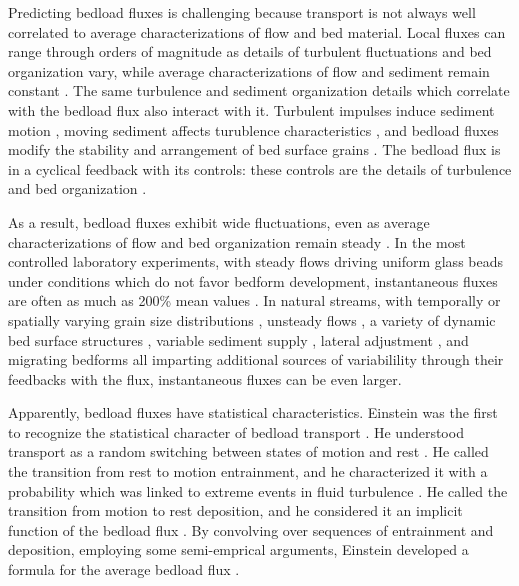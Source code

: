 Predicting bedload fluxes is challenging because transport is not always well correlated to average characterizations of flow and bed material. 
Local fluxes can range through orders of magnitude as details of turbulent fluctuations and bed organization vary, while average characterizations of flow and sediment remain constant \citep{Sumer2003, Charru2004, Hassan2008, Venditti2017}.
The same turbulence and sediment organization details which correlate with the bedload flux also interact with it. 
Turbulent impulses induce sediment motion \citep{Valyrakis2010, Celik2014, Amir2014, Shih2017}, moving sediment affects turublence characteristics \citep{Singh2010, Santos2014, Liu2016}, and bedload fluxes modify the stability and arrangement of bed surface grains \citep{Kirchener1990, Charru2004, Hassan2008}.
The bedload flux is in a cyclical feedback with its controls: these controls are the details of turbulence and bed organization \citep{Jerolmack2005}. 

As a result, bedload fluxes exhibit wide fluctuations, even as average characterizations of flow and bed organization remain steady \citep{Ancey2014}.
In the most controlled laboratory experiments, with steady flows driving uniform glass beads under conditions which do not favor bedform development, instantaneous fluxes are often as much as 200\% mean values \citep{Bohm2004, Ancey2008, Heyman2014, Heyman2016}. 
In natural streams, with temporally or spatially varying grain size distributions \citep{Lisle1992, Chen2008}, unsteady flows \citep{Mao2012, FerrerBoix2015}, a variety of dynamic bed surface structures \citep{Hassan2008, Venditti2017}, variable sediment supply \citep{Madej2009, Elgueta2018}, lateral adjustment \citep{Pitlick2013, Redolfi2018}, and migrating bedforms \citep{Gomez1989, Dhont2018} all imparting additional sources of variabilility through their feedbacks with the flux, instantaneous fluxes can be even larger. 

Apparently, bedload fluxes have statistical characteristics.
Einstein was the first to recognize the statistical character of bedload transport \citep{Einstein1937}. 
He understood transport as a random switching between states of motion and rest \citep{Einstein1942, Einstein1950}. 
He called the transition from rest to motion entrainment, and he characterized it with a probability which was linked to extreme events in fluid turbulence \citep{Einstein1949, Einstein1950}. 
He called the transition from motion to rest deposition, and he considered it an implicit function of the bedload flux \citep{Einstein1942, Einstein1950}. 
By convolving over sequences of entrainment and deposition, employing some semi-emprical arguments, Einstein developed a formula for the average bedload flux \citep{Einstein1950}. 

